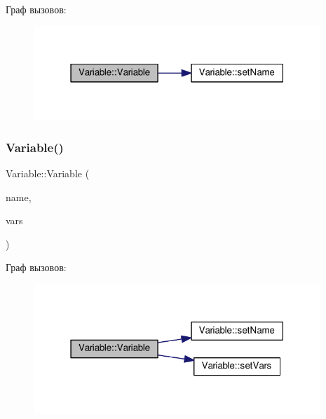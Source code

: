 Граф вызовов\+:\nopagebreak
\begin{figure}[H]
\begin{center}
\leavevmode
\includegraphics[width=307pt]{class_variable_ae347cff8c66e1fb58b5fd90b9f19956a_cgraph}
\end{center}
\end{figure}
\mbox{\label{class_variable_af3512a97c66e98c40a4aa69c9d65e22a}} 
\subsubsection{\texorpdfstring{Variable()}{Variable()}\hspace{0.1cm}{\footnotesize\ttfamily [3/4]}}
{\footnotesize\ttfamily Variable\+::\+Variable (\begin{DoxyParamCaption}\item[{const Q\+Char}]{name,  }\item[{const Q\+List$<$ bool $>$ $\ast$}]{vars }\end{DoxyParamCaption})}

Граф вызовов\+:\nopagebreak
\begin{figure}[H]
\begin{center}
\leavevmode
\includegraphics[width=307pt]{class_variable_af3512a97c66e98c40a4aa69c9d65e22a_cgraph}
\end{center}
\end{figure}
\mbox{\label{class_variable_af55f1231f40b8fc1bb6fbca091a43c83}} 
